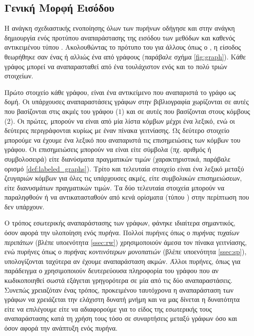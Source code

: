 \subsection{Γενική Μορφή Εισόδου}
Η ανάγκη σχεδιαστικής ενοποίησης όλων των πυρήνων οδήγησε και στην ανάγκη δημιουργία ενός προτύπου αναπαράστασης της εισόδου των μεθόδων  και  καθενός αντικειμένου τύπου .
Ακολουθώντας το πρότυπο του  για άλλους  όπως ο , η είσοδος θεωρήθηκε σαν ένας \textit{} ή αλλιώς ένα  από γράφους (παράβαλε σχήμα \ref{fig:graph}).
Κάθε γράφος μπορεί να αναπαρασταθεί από ένα  τουλάχιστον ενός και το πολύ τριών στοιχείων.\par
Πρώτο στοιχείο κάθε γράφου, είναι ένα αντικείμενο που αναπαριστά το γράφο ως δομή.
Οι υπάρχουσες αναπαραστάσεις γράφων στην βιβλιογραφία χωρίζονται σε αυτές που βασίζονται στις ακμές του γράφου ($1$) και σε αυτές που βασίζονται στους κόμβους ($2$).
Οι πρώτες, μπορούν να είναι από μία λίστα κόμβων μέχρι ένα λεξικό, ενώ οι δεύτερες περιγράφονται κυρίως με έναν πίνακα γειτνίασης. 
Ως δεύτερο στοιχείο μπορούμε να έχουμε ένα λεξικό που αναπαριστά τις επισημειώσεις των κόμβων του γράφου.
Οι επισημειώσεις μπορούν να είναι είτε σύμβολα (πχ. αριθμός ή συμβολοσειρά) είτε διανύσματα πραγματικών τιμών (χαρακτηριστικά, παράβαλε ορισμό \ref{def:labeled_graphs}).
Τρίτο και τελευταία στοιχείο είναι ένα λεξικό μεταξύ ζευγαριών κόμβων για όλες τις υπάρχουσες ακμές, είτε συμβολικών επισημειώσεων, είτε διανυσμάτων πραγματικών τιμών.
Τα δύο τελευταία στοιχεία μπορούν να παραληφθούν ή να αντικατασταθούν από κενά ορίσματα (τύπου ) στην περίπτωση που δεν υπάρχουν.\par
Ο τρόπος εσωτερικής αναπαράστασης των γράφων, φάνηκε ιδιαίτερα σημαντικός, όσον αφορά την υλοποίηση ενός πυρήνα.
Πολλοί πυρήνες όπως ο \textit{πυρήνας τυχαίων περιπάτων} (βλέπε υποενότητα \ref{ssec:rw}) χρησιμοποιούν άμεσα τον πίνακα γειτνίασης, ενώ πυρήνες όπως ο \textit{πυρήνας κοντινότερων μονοπατιών} (βλέπε υποενότητα \ref{ssec:sp}), υπολογίζονται ταχύτερα αν έχουμε αναπαράσταση ακμών.
Άλλοι πυρήνες, όπως για παράδειγμα ο  χρησιμοποιούν δευτερεύουσα πληροφορία του γράφου που αν κωδικοποιηθεί σωστά εξάγεται γρηγορότερα σε μία από τις δύο αναπαραστάσεις.
Συνεπώς χρειαζόταν ένας τρόπος, προκειμένου ταυτόχρονα η αναπαράσταση των γράφων να χρειάζεται την ελάχιστη δυνατή μνήμη και να μας δίνεται η δυνατότητα είτε να επιλέγουμε είτε να αδιαφορούμε για το είδος της εσωτερικής τους αναπαράστασης κατά τη χρήση τους τόσο σε συναρτήσεις μεταξύ γράφων όσο και όσον αφορά την ανάπτυξη ενός πυρήνα.
